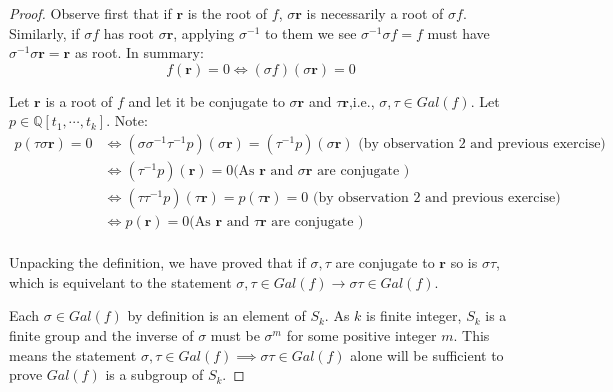 \documentclass{article}
\theoremstyle{definition}
\theoremstyle{definition}
\theoremstyle{remark}
\newcommand{\bb}[1]{\mathbb{#1}} %
\begin{document}
\begin{proof}

	Observe first that if $\bm{r}$ is the root of $f$, $\sigma\bm{r}$ is necessarily a root of $\sigma f$. Similarly, if $\sigma f$ has root $\sigma \bm{r}$, applying $\sigma^{-1}$ to them we see $\sigma^{-1} \sigma f = f$ must have $\sigma^{-1} \sigma \bm{r} = \bm{r}$ as root.
	In summary:
	\begin{equation}
		f(\bm{r}) = 0 \iff   (\sigma f)(\sigma \bm{ r}) = 0
	\end{equation}


	Let $\bm{r}$ is a root of $f$ and let it be conjugate to $\sigma \bm{r}$ and $\tau \bm{r}$,i.e., $\sigma, \tau\in Gal(f)$. 
	Let $p \in \bb{Q}[t_1, \cdots, t_k]$. 
	Note:
	\begin{equation}
		\begin{split}
		p(\tau \sigma \bm{r}) = 0 
		&\iff (\sigma \sigma^{-1} \tau^{-1}p)(\sigma \bm{r}) = (\tau^{-1} p)(\sigma \bm{r})    \text{ (by observation 2 and previous exercise)}\\
		&\iff (\tau^{-1} p)(\bm{r}) = 0 \text{(As $\bm{r}$ and $\sigma \bm{r}$ are conjugate )} \\
		&\iff  (\tau \tau^{-1}p)(\tau \bm{r}) = p(\tau \bm{r})= 0 \text{ (by observation 2 and previous exercise)} \\
		&\iff p(\bm{r}) = 0 \text{(As $\bm{r}$ and $\tau \bm{r}$ are conjugate )} \\
		\end{split}
	\end{equation}

	Unpacking the definition, we have proved that if $\sigma, \tau$ are conjugate to $\bm{r}$ so is $\sigma \tau$, which is equivelant to the statement $\sigma, \tau \in Gal(f) \rightarrow \sigma \tau \in Gal(f)$.
		
	Each $\sigma \in Gal(f)$ by definition is an element of $S_k$.
	As $k$ is finite integer, $S_k$ is a finite group and the inverse of $\sigma$ must be $\sigma^m$ for some positive integer $m$. 
	This means the statement $\sigma, \tau \in Gal(f) \implies \sigma \tau \in Gal(f)$ alone will be sufficient to prove $Gal(f)$ is a subgroup of $S_k$.


\end{proof}
\end{document}
